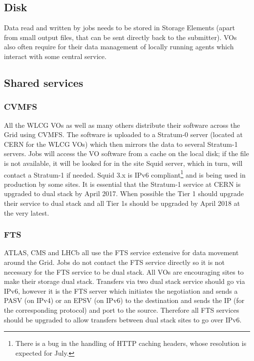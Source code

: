 \documentclass[11pt]{article}
\begin{document}
\subsection{Disk}
Data read and written by jobs needs to be stored in Storage Elements (apart from small output files, that can be sent directly back to the submitter). VOs also often require for their data management of locally running agents which interact with some central service.





\subsection{Shared services}
\subsubsection{CVMFS}
All the WLCG VOs as well as many others distribute their software across the Grid using CVMFS. The software is uploaded to a Stratum-0 server (located at CERN for the WLCG VOs) which then mirrors the data to several Stratum-1 servers\cite{Stratum1}.  Jobs will access the VO software from a cache on the local disk; if the file is not available, it will be looked for in the site Squid server, which in turn, will contact a Stratum-1 if needed.  Squid 3.x is IPv6 compliant\footnote{There is a bug in the handling of HTTP caching headers, whose resolution is expected for July.} and is being used in production by some sites.  It is essential that the Stratum-1 service at CERN is upgraded to dual stack by April 2017.  When possible the Tier 1 should upgrade their service to dual stack and all Tier 1s should be upgraded by April 2018 at the very latest.

\subsubsection{FTS}
ATLAS, CMS and LHCb all use the FTS service extensive for data movement around the Grid.  Jobs do not contact the FTS service directly so it is not necessary for the FTS service to be dual stack.  All VOs are encouraging sites to make their storage dual stack.  Transfers via two dual stack service should go via IPv6, however it is the FTS server which initiates the negotiation and sends a PASV (on IPv4) or an EPSV (on IPv6) to the destination and sends the IP (for the corresponding protocol) and port to the source.  Therefore all FTS services should be upgraded to allow transfers between dual stack sites to go over IPv6.  
\end{document}
